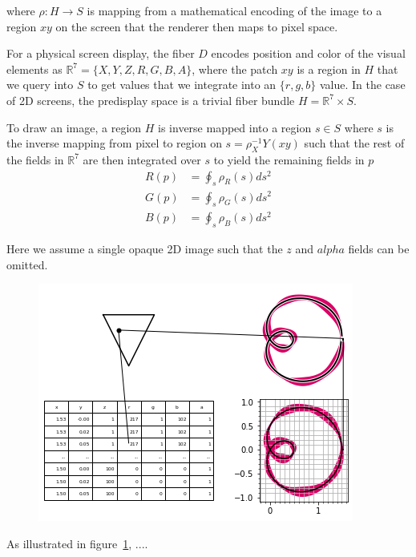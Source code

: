 \documentclass[../main.tex]{subfiles}
\begin{document}
where $\rho: H \rightarrow S$ is mapping from a mathematical encoding of the image to a region $xy$ on the screen that the renderer then maps to pixel space. 

For a physical screen display, the fiber $D$ encodes position and color of the visual elements as $\mathbb{R}^{7} = \{X, Y, Z, R, G, B, A\}$, where the patch $xy$ is a region in $H$ that we query into $S$ to get values that we integrate into an $\{r, g, b\}$ value. In the case of 2D screens, the predisplay space is a trivial fiber bundle $H=\mathbb{R}^{7}\times S$.

To draw an image, a region  $H$ is inverse mapped into a region $s \in S$ where $s$ is the inverse mapping from pixel to region on $s = \rho^{-1}_XY(xy)$ such that the rest of the fields in $\mathbb{R}^{7}$ are then integrated over $s$ to yield the remaining fields in $p$
\begin{align}
    R(p) &= \oint_s \rho_R(s)ds^{2}\\
    G(p) &= \oint_s \rho_G(s)ds^{2}\\
    B(p) &= \oint_s \rho_B(s)ds^{2}
\end{align}

Here we assume a single opaque 2D image such that the $z$ and $alpha$ fields can be omitted. 

\begin{figure}[h]
    \includegraphics[width=.4\linewidth]{figures/sections/math/render.png}
    \caption{}
    \label{fig:render}
\end{figure}

As illustrated in figure~\ref{fig:render}, ....
\end{document}
